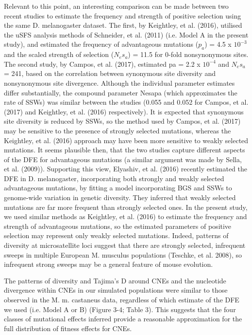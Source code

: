 Relevant to this point, an interesting comparison can be made between two recent studies to estimate the frequency and strength of positive selection using the same D. melanogaster dataset. The first, by Keightley, et al. (2016), utilised the uSFS analysis methods of Schneider, et al. (2011) (i.e. Model A in the present study), and estimated the frequency of advantageous mutations ($p_a$) = 4.5 x $10^{-3}$ and the scaled strength of selection ($N_es_a$) = 11.5 for 0-fold nonsynonymous sites. The second study, by Campos, et al. (2017), estimated pa = 2.2 x $10^{-4}$ and $N_es_a$ = 241, based on the correlation between synonymous site diversity and nonsynonymous site divergence. Although the individual parameter estimates differ substantially, the compound parameter Nesapa (which approximates the rate of SSWs) was similar between the studies (0.055 and 0.052 for Campos, et al. (2017) and Keightley, et al. (2016) respectively). It is expected that synonymous site diversity is reduced by SSWs, so the method used by Campos, et al. (2017) may be sensitive to the presence of strongly selected mutations, whereas the Keightley, et al. (2016) approach may have been more sensitive to weakly selected mutations. It seems plausible then, that the two studies capture different aspects of the DFE for advantageous mutations (a similar argument was made by Sella, et al. (2009)). Supporting this view, Elyashiv, et al. (2016) recently estimated the DFE in D. melanogaster, incorporating both strongly and weakly selected advantageous mutations, by fitting a model incorporating BGS and SSWs to genome-wide variation in genetic diversity. They inferred that weakly selected mutations are far more frequent than strongly selected ones. In the present study, we used similar methods as Keightley, et al. (2016) to estimate the frequency and strength of advantageous mutations, so the estimated parameters of positive selection may represent only weakly selected mutations. Indeed, patterns of diversity at microsatellite loci suggest that there are strongly selected, infrequent sweeps in multiple European M. musculus populations (Teschke, et al. 2008), so infrequent strong sweeps may be a general feature of mouse evolution.

The patterns of diversity and Tajima’s D around CNEs and the nucleotide divergence within CNEs in our simulated populations were similar to those observed in the M. m. castaneus data, regardless of which estimate of the DFE we used (i.e. Model A or B) (Figure 3-4; Table 3). This suggests that the four classes of mutational effects inferred provide a reasonable approximation for the full distribution of fitness effects for CNEs.

